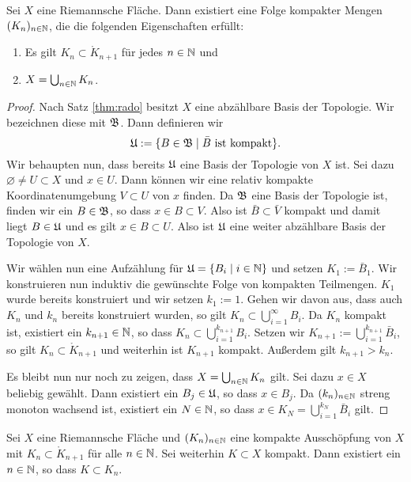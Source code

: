 \begin{thm}
  \label{thm:kompakte-ausschöpfung}
  Sei $X$ eine Riemannsche Fläche. Dann existiert eine Folge kompakter Mengen
  $(K_n)_{n \in \mathbb{N}}$, die die folgenden Eigenschaften erfüllt:
  \begin{enumerate}
  \item Es gilt $K_n \subset \mathring K_{n+1}$ für jedes $n \in \mathbb{N}$ und
  \item $X = \bigcup_{n \in \mathbb{N}} K_n$.
  \end{enumerate}
\end{thm}

\begin{proof}
  Nach Satz \ref{thm:rado} besitzt $X$ eine abzählbare Basis der
  Topologie. Wir bezeichnen diese mit $\mathfrak{B}$. Dann definieren wir
  \[
  \mathfrak{U} := \{ B \in \mathfrak{B} \mid \bar B \text{ ist kompakt}\}.
  \]
  Wir behaupten nun, dass bereits $\mathfrak{U}$ eine Basis der Topologie von
  $X$ ist. Sei dazu $\varnothing \neq U \subset X$ und $x \in U$. Dann
  können wir eine relativ kompakte Koordinatenumgebung $V \subset U$
  von $x$ finden. Da $\mathfrak{B}$ eine Basis der Topologie ist, finden wir
  ein $B \in \mathfrak{B}$, so dass $x \in B \subset V$. Also ist $\bar B
  \subset \bar V$ kompakt und damit liegt $B \in \mathfrak{U}$ und es gilt $x
  \in B \subset U$. Also ist $\mathfrak{U}$ eine weiter abzählbare Basis der
  Topologie von $X$.

  Wir wählen nun eine Aufzählung für $\mathfrak{U} = \{B_i \mid i \in \mathbb{N}\}$ und
  setzen $K_1 := \bar B_1$. Wir konstruieren nun induktiv die
  gewünschte Folge von kompakten Teilmengen. $K_1$ wurde bereits
  konstruiert und wir setzen $k_1 := 1$. Gehen wir davon aus, dass auch
  $K_n$ und $k_n$ bereits
  konstruiert wurden, so gilt $K_n \subset \bigcup_{i=1}^\infty
  B_i$. Da $K_n$ kompakt ist, existiert ein $k_{n+1} \in \mathbb{N}$, so dass $K_n
  \subset \bigcup_{i=1}^{k_{n+1}} B_i$. Setzen wir $K_{n+1} :=
  \bigcup_{i=1}^{k_{n+1}}\bar B_i$, so gilt $K_n \subset \mathring
  K_{n+1}$ und weiterhin ist $K_{n+1}$ kompakt. Außerdem gilt
  $k_{n+1} > k_n$.

  Es bleibt nun nur noch zu zeigen, dass $X = \bigcup_{n \in \mathbb{N}} K_n$
  gilt. Sei dazu $x \in X$ beliebig gewählt. Dann existiert ein $B_j \in
  \mathfrak{U}$, so dass $x \in B_j$. Da $(k_n)_{n \in\mathbb{N}}$ streng monoton
  wachsend ist, existiert ein $N \in \mathbb{N}$, so dass $x \in K_N =
  \bigcup_{i=1}^{k_N} \bar B_i$ gilt.
\end{proof}

\begin{lemma}
  \label{lemma:kompakt-in-ausschöpfung}
  Sei $X$ eine Riemannsche Fläche und $(K_n)_{n \in \mathbb{N}}$ eine kompakte
  Ausschöpfung von $X$ mit $K_n \subset \mathring K_{n+1}$ für alle $n
  \in \mathbb{N}$. Sei weiterhin $K \subset X$ kompakt. Dann existiert ein $n
  \in \mathbb{N}$, so dass $K \subset K_n$.
\end{lemma}

